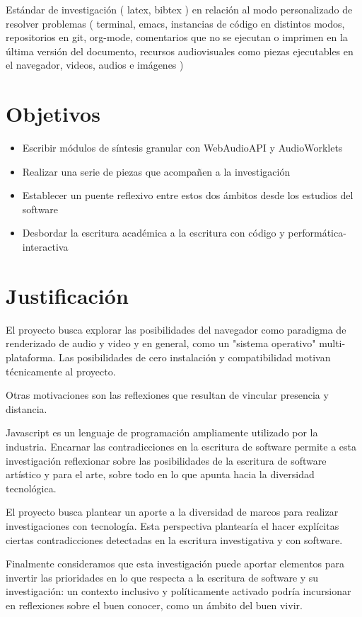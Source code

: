 Estándar de investigación ( latex, bibtex ) en relación al modo personalizado de resolver problemas ( terminal, emacs, instancias de código en distintos modos, repositorios en git, org-mode, comentarios que no se ejecutan o imprimen en la última versión del documento, recursos audiovisuales como piezas ejecutables en el navegador, videos, audios e imágenes )


\section{Objetivos}

\begin{itemize}
\item Escribir módulos de síntesis granular con WebAudioAPI y AudioWorklets
\item Realizar una serie de piezas que acompañen a la investigación
\item Establecer un puente reflexivo entre estos dos ámbitos desde los estudios del software
\item Desbordar la escritura académica a la escritura con código y performática-interactiva
\end{itemize}

\section{Justificación}

El proyecto busca explorar las posibilidades del navegador como paradigma de renderizado de audio y video y en general, como un "sistema operativo" multi-plataforma. Las posibilidades de cero instalación y compatibilidad motivan técnicamente al proyecto.

Otras motivaciones son las reflexiones que resultan de vincular presencia y distancia.


Javascript es un lenguaje de programación ampliamente utilizado por la industria. Encarnar las contradicciones en la escritura de software permite a esta investigación reflexionar sobre las posibilidades de la escritura de software artístico y para el arte, sobre todo en lo que apunta hacia la diversidad tecnológica.

El proyecto busca plantear un aporte a la diversidad de marcos para realizar investigaciones con tecnología. Esta perspectiva plantearía el hacer explícitas ciertas contradicciones detectadas en la escritura investigativa y con software. 

Finalmente consideramos que esta investigación puede aportar elementos para invertir las prioridades en lo que respecta a la escritura de software y su investigación: un contexto inclusivo y políticamente activado podría incursionar en reflexiones sobre el buen conocer, como un ámbito del buen vivir. 

